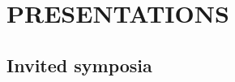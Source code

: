\documentclass[11pt,english]{article}\usepackage[]{graphicx}\usepackage[]{xcolor}
\begin{document}
\vspace{0.5ex}



\section*{PRESENTATIONS}
\vspace{-0.5ex}

\subsection*{Invited symposia}
\vspace{-1ex}

\end{document}

